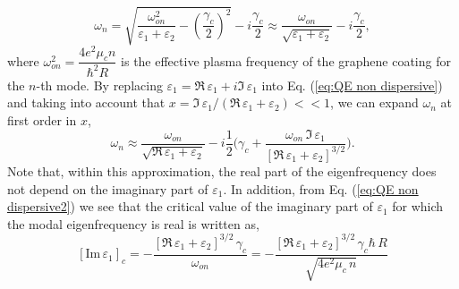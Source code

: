 \documentclass[9pt,twocolumn,twoside]{osajnl}
\begin{document}
\begin{equation}
\label{eq:QE non dispersive}
\omega_n = \sqrt{\dfrac{\omega^2_{on}}{\varepsilon_1+\varepsilon_2}-\left(\dfrac{\gamma_c}{2}\right)^2} -i \dfrac{\gamma_c}{2} \approx \dfrac{\omega_{on}}{\sqrt{\varepsilon_1+\varepsilon_2}}-i\dfrac{\gamma_c}{2},
\end{equation}
where $\omega^2_{on} = \dfrac{4e^2\mu_c n }{\hbar^2R}$ is the effective plasma frequency of the graphene coating for the $n$-th mode. By replacing $\varepsilon_1=\Re\,\varepsilon_1+i\Im\,\varepsilon_1$ into Eq. (\ref{eq:QE non dispersive}) and taking into account that $x=\Im\,\varepsilon_1/(\Re\,\varepsilon_1+\varepsilon_2)<<1$, we can expand $\omega_n$ at first order in $x$,  
\begin{equation}
\label{eq:QE non dispersive2}
\omega_n  \approx \dfrac{\omega_{on}}{\sqrt{\Re\,\varepsilon_1+\varepsilon_2}}-i \frac{1}{2} \Big(\gamma_c+\frac{\omega_{on}\,\Im\,\varepsilon_1}{[\Re\,\varepsilon_1+\varepsilon_2]^{3/2}}\Big).
\end{equation}
%
%
%
Note that, within this approximation, the real part of the eigenfrequency does not depend on the imaginary part of $\varepsilon_1$. In addition, from Eq. (\ref{eq:QE non dispersive2}) we see that the critical value of the imaginary part of $\varepsilon_1$ for which the modal eigenfrequency is real is written as,  %
%
\begin{equation}
\label{eq:im epsi1 crit 2 QE non dispersive}
[\text{Im}\,\varepsilon_1 ]_c = -\dfrac{[\Re\,\varepsilon_1+\varepsilon_2]^{3/2}\, \gamma_c}{ \omega_{on}}=-\dfrac{[\Re\,\varepsilon_1+\varepsilon_2]^{3/2}\, \gamma_c \hbar \, R}{\sqrt{4 e^{2}\mu_c \,n } }    
\end{equation}
%
\end{document}
